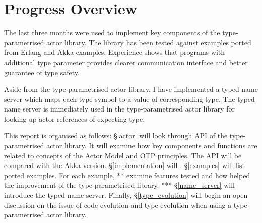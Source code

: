 \section{Progress Overview}

The last three months were used to implement key components of the type-parametrised actor library.  The library has been tested against examples ported from Erlang and Akka examples.  Experience shows that programs with additional type parameter provides clearer communication interface and better guarantee of type safety.

Aside from the type-parametrised actor library, I have implemented a typed name server which maps each type symbol to a value of corresponding type.  The typed name server is immediately used in the type-parametrised actor library for looking up actor references of expecting type.

This report is organised as follows: \S\ref{actor} will look through API of the type-parametrised actor library.  It will examine how key components and functions are related to concepts of the Actor Model \cite{actor_2} and OTP principles\cite{OTP}.  The API will be compared with the Akka version.  \S\ref{implementation} will . \S\ref{examples} will list ported examples.  For each example, ** examine features tested and how helped the improvement of the type-parametrised library.  ***  \S\ref{name_server} will introduce the typed name server.  Finally, \S\ref{type_evolution} will begin an open discussion on the issue of code evolution and type evolution when using a type-parametrised actor library.

\begin{comment}


-- The design of new Actor API

-- Ported Akka examples
** Two out of three examples identified in the last report are ported and tested.  The riak example is suspended because ...
** asked for more examples from akka developer team

--  key differences and the reasons for these

-- implementation strategy: sub-typing is not suitable, delegation is good but difficult at some point.  In this prototype implementation, use sub-typing where **, but not encouraging ***.

-- Other issues of using the API

     ** ActorRef as part of the message



-- Typed name server
-- audited name server 


TODO:
code evolution
type evolution

=============================
\end{comment}



